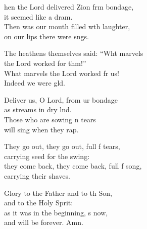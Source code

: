 \settowidth{\versewidth}{they come back, they come back, full of song, *}
\begin{psalmverse}%
  \begin{patverse}
hen the Lord delivered Zion frm bondage,\Med\\
it seemed like a dram.\\
Then was our mouth filled w\pointup{\i}th laughter,\Med\\
on our lips there were sngs.

The heathens themselves said: “Wht marvels\Med\\
the Lord worked for thm!”\\
What marvels the Lord worked fr us!\Med\\
Indeed we were gld.

Deliver us, O Lord, from ur bondage\Med\\
as streams in dry lnd.\\
Those who are sowing \pointup{\i}n tears\Med\\
will sing when they rap.

They go out, they go out, full f tears,\Med\\
carrying seed for the swing:\\
they come back, they come back, full f song,\Med\\
carrying their shaves.

Glory to the Father and to th Son,\Med\\
and to the Holy Sprit:\\
as it was in the beginning, \pointup{\i}s now,\Med\\
and will be forever. Amn. 
  \end{patverse}
\end{psalmverse}
